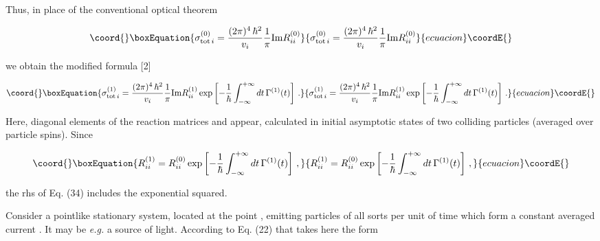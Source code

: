 \documentclass[a4paper,12pt]{article}
\begin{document}
Thus, in place of the conventional optical theorem

\begin{equation}\coord{}\boxEquation{
\sigma^{(0)}_{{\rm tot}\,i} = \frac{(2\pi)^4\,\hbar^2}{v_i} \frac{1}{\pi} {\rm Im} R^{(0)}_{ii}
}{
\sigma^{(0)}_{{\rm tot}\,i} = \frac{(2\pi)^4\,\hbar^2}{v_i} \frac{1}{\pi} {\rm Im} R^{(0)}_{ii}
}{ecuacion}\coordE{}\end{equation}

\ni we obtain the modified formula [2]

\begin{equation}\coord{}\boxEquation{
\sigma^{(1)}_{{\rm tot}\,i} = \frac{(2\pi)^4\,\hbar^2}{v_i} \frac{1}{\pi} {\rm Im} R^{(1)}_{ii} \exp \left[-\frac{1}{\hbar} \int^{+\infty}_{-\infty} dt\, \Gamma^{(1)}(t) \right]\,.
}{
\sigma^{(1)}_{{\rm tot}\,i} = \frac{(2\pi)^4\,\hbar^2}{v_i} \frac{1}{\pi} {\rm Im} R^{(1)}_{ii} \exp \left[-\frac{1}{\hbar} \int^{+\infty}_{-\infty} dt\, \Gamma^{(1)}(t) \right]\,.
}{ecuacion}\coordE{}\end{equation}

\ni Here, diagonal elements of the reaction matrices \coordHE{} and \coordHE{} appear, calculated in initial asymptotic states \coordHE{} of two colliding particles (averaged over particle spins). Since

\begin{equation}\coord{}\boxEquation{
R^{(1)}_{ii} = R^{(0)}_{ii} \exp \left[-\frac{1}{\hbar} \int^{+\infty}_{-\infty} dt\, \Gamma^{(1)}(t) \right]\,,
}{
R^{(1)}_{ii} = R^{(0)}_{ii} \exp \left[-\frac{1}{\hbar} \int^{+\infty}_{-\infty} dt\, \Gamma^{(1)}(t) \right]\,,
}{ecuacion}\coordE{}\end{equation}

\ni the rhs of Eq. (34) includes the exponential squared.

\vspace{0.25cm}


\vspace{0.25cm}

Consider a pointlike stationary system, located at the point \coordHE{}, emitting \coordHE{} particles of all sorts per unit of time which form a constant averaged current \coordHE{}. It may be {\it e.g.} a source of light. According to Eq. (22) that takes here the form
\end{document}
